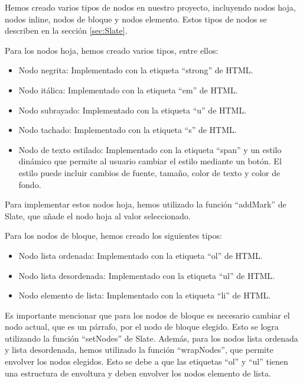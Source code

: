 Hemos creado varios tipos de nodos en nuestro proyecto, incluyendo nodos hoja, nodos inline, nodos de bloque y nodos elemento. Estos tipos de nodos se describen en la sección \ref{sec:Slate}.

Para los nodos hoja, hemos creado varios tipos, entre ellos:

\begin{itemize}
  \item Nodo negrita: Implementado con la etiqueta ``strong'' de HTML.
  \item Nodo itálica: Implementado con la etiqueta ``em'' de HTML.
  \item Nodo subrayado: Implementado con la etiqueta ``u'' de HTML.
  \item Nodo tachado: Implementado con la etiqueta ``s'' de HTML.
  \item Nodo de texto estilado: Implementado con la etiqueta ``span'' y un estilo dinámico que permite al usuario cambiar el estilo mediante un botón. El estilo puede incluir cambios de fuente, tamaño, color de texto y color de fondo.
\end{itemize}
Para implementar estos nodos hoja, hemos utilizado la función ``addMark'' de Slate, que añade el nodo hoja al valor seleccionado.

Para los nodos de bloque, hemos creado los siguientes tipos:

\begin{itemize}
  \item Nodo lista ordenada: Implementado con la etiqueta ``ol'' de HTML.
  \item Nodo lista desordenada: Implementado con la etiqueta ``ul'' de HTML.
  \item Nodo elemento de lista: Implementado con la etiqueta ``li'' de HTML.
\end{itemize}

Es importante mencionar que para los nodos de bloque es necesario cambiar el nodo actual, que es un párrafo, por el nodo de bloque elegido. Esto se logra utilizando la función ``setNodes'' de Slate. Además, para los nodos lista ordenada y lista desordenada, hemos utilizado la función ``wrapNodes'', que permite envolver los nodos elegidos. Esto se debe a que las etiquetas ``ol'' y ``ul'' tienen una estructura de envoltura y deben envolver los nodos elemento de lista.


